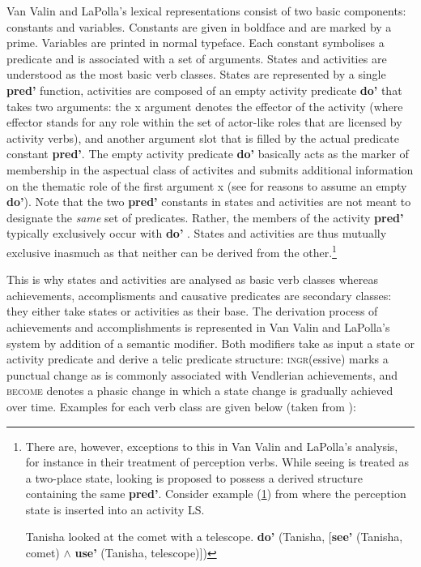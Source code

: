 Van Valin and LaPolla's lexical representations consist of two basic components: constants and variables. Constants are given in boldface and are marked by a prime. Variables are printed in normal typeface. Each constant symbolises a predicate and is associated with a set of arguments. States and activities are understood as the most basic verb classes. States are represented by a single \textbf{pred'} function, activities are composed of an empty activity predicate \textbf{do'} that takes two arguments: the x argument denotes the effector of the activity (where effector stands for any role within the set of actor-like roles that are licensed by activity verbs), and another argument slot that is filled by the actual predicate constant \textbf{pred'}. The empty activity predicate \textbf{do'} basically acts as the marker of membership in the aspectual class of activites and submits additional information on the thematic role of the first argument x (see \citealt[103f.]{van1997syntax} for reasons to assume an empty \textbf{do'}). Note that the two \textbf{pred'} constants in states and activities are not meant to designate the \emph{same} set of predicates. Rather, the members of the activity \textbf{pred'} typically exclusively occur with \textbf{do'} \citep[103]{van1997syntax}. States and activities are thus mutually exclusive inasmuch as that neither can be derived from the other.\footnote{There are, however, exceptions to this in Van Valin and LaPolla's analysis, for instance in their treatment of perception verbs. While seeing is treated as a two-place state, looking is proposed to possess a derived structure containing the same \textbf{pred'}. Consider example (\ref{look}) from \citet[121]{van1997syntax} where the perception state is inserted into an activity LS.

\ea \label{look}
\ea Tanisha looked at the comet with a telescope.
\ex \textbf{do'} (Tanisha, [\textbf{see'} (Tanisha, comet) $\wedge$ \textbf{use'} (Tanisha, telescope)])
\z\z

}

This is why states and activities are analysed as basic verb classes whereas achievements, accomplisments and causative predicates are secondary classes: they either take states or activities as their base. The derivation process of achievements and accomplishments is represented in Van Valin and LaPolla's system by addition of a semantic modifier. Both modifiers take as input a state or activity predicate and derive a telic predicate structure: \textsc{ingr}(essive) marks a punctual change as is commonly associated with Vendlerian achievements, and \textsc{become} denotes a phasic change in which a state change is gradually achieved over time. Examples for each verb class are given below (taken from \citealt[105]{van1997syntax}):

